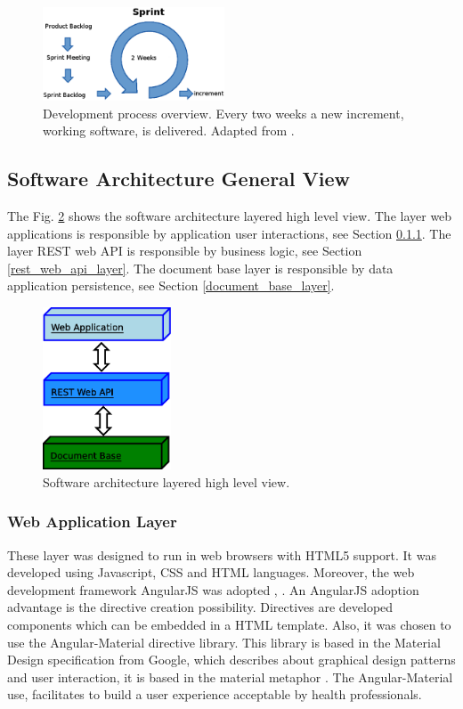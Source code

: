 \documentclass[journal]{IEEEtran}
\begin{document}
\begin{figure}[!t]
	\centering
	\includegraphics[width=0.48\textwidth]{./dev_proc.eps}
	\caption{Development process overview.
		Every two weeks a new increment, working software, is delivered.
		Adapted from \cite{Schwaber2004}.
	}
	\label{dev_proc}
\end{figure}

\subsection{Software Architecture General View}
The Fig. \ref{app_layers} shows the software architecture layered high level view.
The layer web applications is responsible by application user interactions, see Section \ref{web_application_layer}.
The layer REST web API is responsible by business logic, see Section \ref{rest_web_api_layer}.
The document base layer is responsible by data application persistence, see Section \ref{document_base_layer}.
\begin{figure}[!t]
	\centering
	\includegraphics[width=1.5in]{./app_layers.eps}
	\caption{Software architecture layered high level view.
	}
	\label{app_layers}
\end{figure}

\subsubsection{Web Application Layer}
\label{web_application_layer}

These layer was designed to run in web browsers with HTML5 support.
It was developed using Javascript, CSS and HTML languages. 
Moreover, the web development framework AngularJS was adopted \cite{Branas2014}, \cite{Freeman2014}. 
An AngularJS adoption advantage is the directive creation possibility. 
Directives are developed components which can be embedded in a HTML template.
Also, it was chosen to use the Angular-Material directive library. 
This library is based in the Material Design specification from Google, which
describes about graphical design patterns and user interaction, it is based in the material metaphor
\cite{Google2015a}. The Angular-Material use, facilitates to build a user experience acceptable by 
health professionals.
\end{document}
